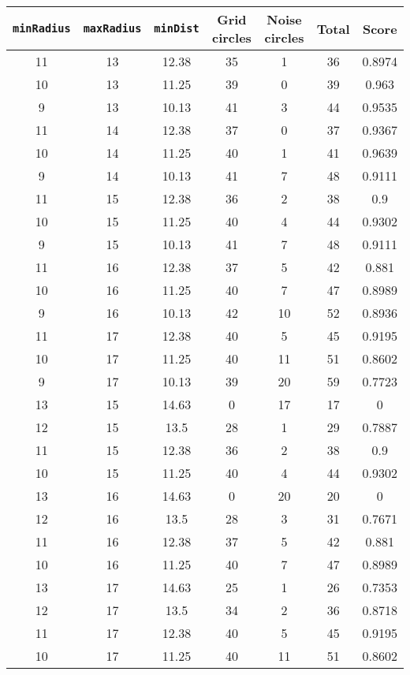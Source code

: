 \documentclass[letterpaper, 12pt]{article}
\begin{document}
\begin{longtable}{|c|c|c|c|c|c|c|}
\hline
\textbf{\texttt{minRadius}} & \textbf{\texttt{maxRadius}} & \textbf{\texttt{minDist}} & \textbf{Grid circles} & \textbf{Noise circles} & \textbf{Total} & \textbf{Score} \\
\hline
11 & 13 & 12.38 & 35 & 1 & 36 & 0.8974 \\
\hline
10 & 13 & 11.25 & 39 & 0 & 39 & 0.963 \\
\hline
9 & 13 & 10.13 & 41 & 3 & 44 & 0.9535 \\
\hline
11 & 14 & 12.38 & 37 & 0 & 37 & 0.9367 \\
\hline
10 & 14 & 11.25 & 40 & 1 & 41 & 0.9639 \\
\hline
9 & 14 & 10.13 & 41 & 7 & 48 & 0.9111 \\
\hline
11 & 15 & 12.38 & 36 & 2 & 38 & 0.9 \\
\hline
10 & 15 & 11.25 & 40 & 4 & 44 & 0.9302 \\
\hline
9 & 15 & 10.13 & 41 & 7 & 48 & 0.9111 \\
\hline
11 & 16 & 12.38 & 37 & 5 & 42 & 0.881 \\
\hline
10 & 16 & 11.25 & 40 & 7 & 47 & 0.8989 \\
\hline
9 & 16 & 10.13 & 42 & 10 & 52 & 0.8936 \\
\hline
11 & 17 & 12.38 & 40 & 5 & 45 & 0.9195 \\
\hline
10 & 17 & 11.25 & 40 & 11 & 51 & 0.8602 \\
\hline
9 & 17 & 10.13 & 39 & 20 & 59 & 0.7723 \\
\hline
13 & 15 & 14.63 & 0 & 17 & 17 & 0 \\
\hline
12 & 15 & 13.5 & 28 & 1 & 29 & 0.7887 \\
\hline
11 & 15 & 12.38 & 36 & 2 & 38 & 0.9 \\
\hline
10 & 15 & 11.25 & 40 & 4 & 44 & 0.9302 \\
\hline
13 & 16 & 14.63 & 0 & 20 & 20 & 0 \\
\hline
12 & 16 & 13.5 & 28 & 3 & 31 & 0.7671 \\
\hline
11 & 16 & 12.38 & 37 & 5 & 42 & 0.881 \\
\hline
10 & 16 & 11.25 & 40 & 7 & 47 & 0.8989 \\
\hline
13 & 17 & 14.63 & 25 & 1 & 26 & 0.7353 \\
\hline
12 & 17 & 13.5 & 34 & 2 & 36 & 0.8718 \\
\hline
11 & 17 & 12.38 & 40 & 5 & 45 & 0.9195 \\
\hline
10 & 17 & 11.25 & 40 & 11 & 51 & 0.8602 \\

\end{longtable}
\end{document}
